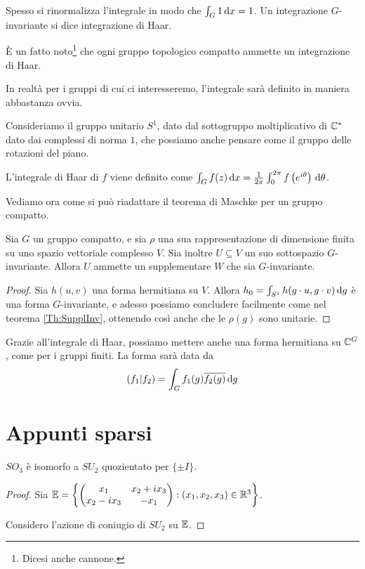 	Spesso si rinormalizza l'integrale in modo che $\int_{G} 1 \, \textrm{d} x=1$. Un integrazione $G$-invariante si dice integrazione di Haar.
	
	\`E un fatto noto\footnote{Dicesi anche cannone.} che ogni gruppo topologico compatto ammette un integrazione di Haar.
	
	In realtà per i gruppi di cui ci interesseremo, l'integrale sarà definito in maniera abbastanza ovvia.
	
	\begin{myexample}
		Consideriamo il gruppo unitario $S^1$, dato dal sottogruppo moltiplicativo di $\mathbb C^*$ dato dai complessi di norma $1$, che possiamo anche pensare come il gruppo delle rotazioni del piano.
		
		L'integrale di Haar di $f$ viene definito come $\int_{G} f(z) \, \textrm{d} x = \frac1{2\pi}\int_0^{2\pi} f\left(e^{i\theta}\right) \, \textrm{d} \theta$.
	\end{myexample}

	Vediamo ora come si può riadattare il teorema di Maschke per un gruppo compatto.
	
	\begin{mytheorem}
		Sia $G$ un gruppo compatto, e sia $\rho$ una sua rappresentazione di dimensione finita su uno spazio vettoriale complesso $V$. Sia inoltre $U \subseteq V$ un suo sottospazio $G$-invariante. Allora $U$ ammette un supplementare $W$ che sia $G$-invariante.
	\end{mytheorem}
	\begin{proof}
		Sia $h(u,v)$ una forma hermitiana su $V$. Allora $h_0=\int_{S^1} h(g\cdot u, g\cdot v)\, \textrm{d} g$ è una forma $G$-invariante, e adesso possiamo concludere facilmente come nel teorema \ref{Th:SupplInv}, ottenendo così anche che le $\rho(g)$ sono unitarie.  
	\end{proof}
	
	Grazie all'integrale di Haar, possiamo mettere anche una forma hermitiana su $\mathbb C^{G}$, come per i gruppi finiti. La forma sarà data da
	\[
		\left(f_1 | f_2\right) = \int_G f_1(g)\overline{f_2(g)} \, \textrm{d} g 
	\]	





\section{Appunti sparsi}


\begin{myprop}
 $SO_3$ è isomorfo a $SU_2$ quozientato per $\{\pm I\}$.
\end{myprop}
\begin{proof}
	Sia $\mathbb E=\left\{\left(
		\begin{matrix}
			x_1	& x_2+ix_3 \\
			x_2-ix_3 & -x_1 
		\end{matrix}
	\right): (x_1,x_2,x_3) \in \mathbb R^3\right\}$.

	Considero l'azione di coniugio di $SU_2$ su $\mathbb E$. 
\end{proof}

